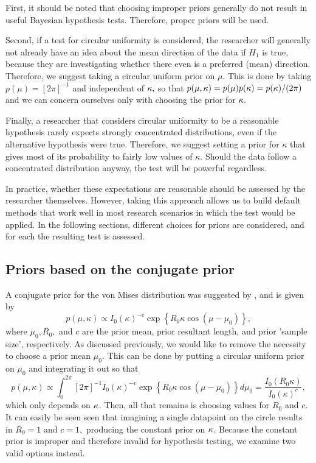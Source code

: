 First, it should be noted that choosing improper priors generally do not result in useful Bayesian hypothesis tests. Therefore, proper priors will be used.

Second, if a test for circular uniformity is considered, the researcher will generally not already have an idea about the mean direction of the data if \( H_1 \) is true, because they are investigating whether there even is a preferred (mean) direction. Therefore, we suggest taking a circular uniform prior on \( \mu \). This is done by taking \( p(\mu) = [2 \pi]^{-1} \) and independent of \( \kappa, \) so that \( p(\mu, \kappa) = p(\mu) p(\kappa) = p(\kappa)/ (2\pi) \) and we can concern ourselves only with choosing the prior for \( \kappa.\)

Finally, a researcher that considers circular uniformity to be a reasonable hypothesis rarely expects strongly concentrated distributions, even if the alternative hypothesis were true. Therefore, we suggest setting a prior for \( \kappa \) that gives most of its probability to fairly low values of \( \kappa \). Should the data follow a concentrated distribution anyway, the test will be powerful regardless.  

In practice, whether these expectations are reasonable should be assessed by the researcher themselves. However, taking this approach allows us to build default methods that work well in most research scenarios in which the test would be applied. In the following sections, different choices for priors are considered, and for each the resulting test is assessed.


\subsection{Priors based on the conjugate prior}
\label{sub:ConjugatePrior}

A conjugate prior for the von Mises distribution was suggested by \citet{guttorp1988finding}, and is given by
\begin{equation}
p(\mu, \kappa) \propto I_0(\kappa)^{-c} \exp \left\{ R_0 \kappa \cos(\mu - \mu_0) \right\},
\end{equation}
where \( \mu_0, R_0, \) and \( c \) are the prior mean, prior resultant length, and prior 'sample size', respectively. As discussed previously, we would like to remove the necessity to choose a prior mean \( \mu_0.\) This can be done by putting a circular uniform prior on \( \mu_0 \) and integrating it out so that
\begin{equation}
p(\mu, \kappa) \propto \int_0^{2 \pi} [2\pi ]^{-1} I_0(\kappa)^{-c} \exp \left\{ R_0 \kappa \cos(\mu - \mu_0) \right\} d\mu_0 = \frac{I_0(R_0 \kappa)}{I_0(\kappa)^{c}},
\end{equation}
which only depends on \( \kappa\). Then, all that remains is choosing values for \( R_0 \) and \( c \). It can easily be seen seen that imagining a single datapoint on the circle results in \( R_0 = 1 \) and \( c = 1,\) producing the constant prior on \(\kappa\). Because the constant prior is improper and therefore invalid for hypothesis testing, we examine two valid options instead. %

